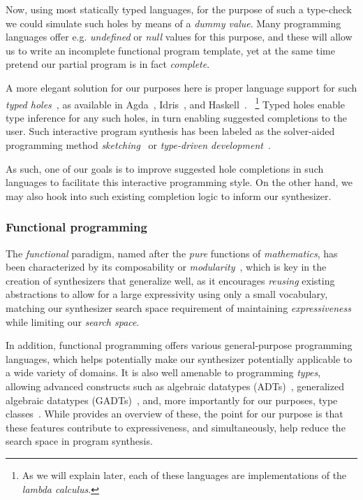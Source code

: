 \documentclass{article}
\begin{document}
Now, using most statically typed languages,
for the purpose of such a type-check we could simulate such holes by means of a \emph{dummy value}.
Many programming languages offer e.g. \emph{undefined} or \emph{null} values for this purpose,
and these will allow us to write an incomplete functional program template,
yet at the same time pretend our partial program is in fact \emph{complete}.

A more elegant solution for our purposes here is proper language support for such \emph{typed holes}~\citep{hashimoto1997typed},
as available in Agda~\citep{holesagda},
Idris~\citep{holesidris},
and Haskell~\citep{holeshaskell}.%
~\footnote{As we will explain later, each of these languages are implementations of the \emph{lambda calculus}.}
Typed holes enable type inference for any such holes,
in turn enabling suggested completions to the user.
Such interactive program synthesis has been labeled as the solver-aided
programming method \emph{sketching}~\citep{gulwani2017program} or
\emph{type-driven development}~\citep{typedrivendev}.

As such, one of our goals is to improve suggested hole completions in such languages to facilitate this interactive programming style.
On the other hand, we may also hook into such existing completion logic to inform our synthesizer.

\subsubsection{Functional programming}


The \emph{functional} paradigm,
named after the \emph{pure} functions of \emph{mathematics},
has been characterized by its composability or \emph{modularity}~\citep{hughes1989functional},
which is key in the creation of synthesizers that generalize well,
as it encourages \emph{reusing} existing abstractions to allow for a large expressivity using only a small vocabulary,
matching our synthesizer search space requirement of maintaining \emph{expressiveness} while limiting our \emph{search space}.

In addition, functional programming offers various general-purpose programming languages,
which helps potentially make our synthesizer potentially applicable to a wide variety of domains.
It is also well amenable to programming \emph{types},
allowing advanced constructs such as
algebraic datatypes (ADTs)~\citep{burstall1977design},
generalized algebraic datatypes (GADTs)~\citep{dybjer1991logical},
and, more importantly for our purposes, type classes~\citep{blott1991type}.
While \citet{haskellhistory} provides an overview of these,
the point for our purpose is that these features contribute to expressiveness,
and simultaneously, help reduce the search space in program synthesis.
\end{document}
